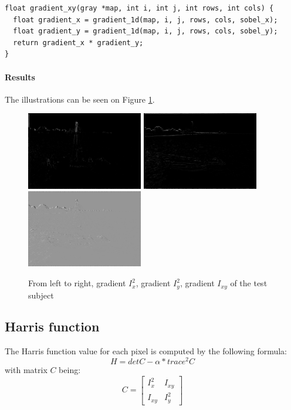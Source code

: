 \documentclass[a4paper, 10pt]{article}
\begin{document}
\begin{lstlisting}[frame=single]
float gradient_xy(gray *map, int i, int j, int rows, int cols) {
  float gradient_x = gradient_1d(map, i, j, rows, cols, sobel_x);
  float gradient_y = gradient_1d(map, i, j, rows, cols, sobel_y);
  return gradient_x * gradient_y;
}
\end{lstlisting}

\paragraph{Results} The illustrations can be seen on Figure \ref{fig-gradient-square}.

\begin{figure}[!htb]
\centering
\includegraphics[width=192px]{boat3x3_5_grad_x2.png}
\includegraphics[width=192px]{boat3x3_5_grad_y2.png}
\includegraphics[width=192px]{boat3x3_5_grad_xy.png}
\caption{From left to right, gradient $I_x^2$, gradient $I_y^2$, gradient $I_{xy}$ of the test subject}
\label{fig-gradient-square}
\end{figure}

\subsection{Harris function}
The Harris function value for each pixel is computed by the following formula:
\begin{equation}
H = detC - \alpha * trace^2C
\label{eq-harris}
\end{equation}
with matrix $C$ being:
\begin{equation}
C = \left[
\begin{matrix}
I^2_x & I_{xy} \\
I_{xy} & I^2_y
\end{matrix}
\right]
\end{equation}
\end{document}
